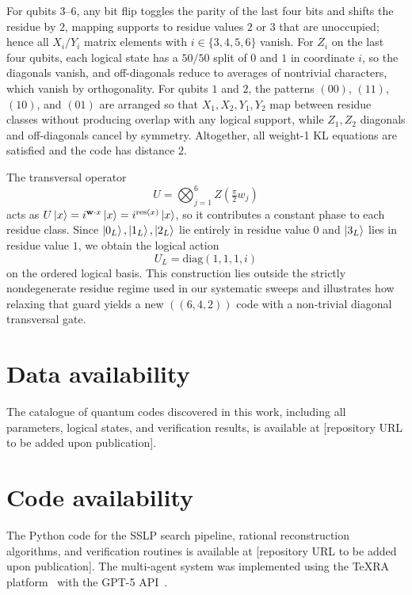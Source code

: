 \documentclass[pdflatex,sn-nature]{sn-jnl}%
\theoremstyle{thmstyleone}%
\theoremstyle{thmstyletwo}%
\theoremstyle{thmstylethree}%
\begin{document}
For qubits $3$–$6$, any bit flip toggles the parity of the last four bits and shifts the residue by $2$, mapping supports to residue values $2$ or $3$ that are unoccupied; hence all $X_i/Y_i$ matrix elements with $i\in\{3,4,5,6\}$ vanish. For $Z_i$ on the last four qubits, each logical state has a $50/50$ split of $0$ and $1$ in coordinate $i$, so the diagonals vanish, and off-diagonals reduce to averages of nontrivial characters, which vanish by orthogonality. For qubits $1$ and $2$, the patterns $(00)$, $(11)$, $(10)$, and $(01)$ are arranged so that $X_1,X_2,Y_1,Y_2$ map between residue classes without producing overlap with any logical support, while $Z_1,Z_2$ diagonals and off-diagonals cancel by symmetry. Altogether, all weight-1 KL equations are satisfied and the code has distance $2$.

The transversal operator
\[
  U=\bigotimes_{j=1}^6 Z\!\left(\tfrac{\pi}{2} w_j\right)
\]
acts as $U\ket{x}=i^{\mathbf w\cdot x}\ket{x}=i^{\operatorname{res}(x)}\ket{x}$, so it contributes a constant phase to each residue class. Since $\ket{0_L},\ket{1_L},\ket{2_L}$ lie entirely in residue value $0$ and $\ket{3_L}$ lies in residue value $1$, we obtain the logical action
\[
  U_L=\mathrm{diag}(1,1,1,i)
\]
on the ordered logical basis. This construction lies outside the strictly nondegenerate residue regime used in our systematic sweeps and illustrates how relaxing that guard yields a new $((6,4,2))$ code with a non-trivial diagonal transversal gate.







\section*{Data availability}
The catalogue of quantum codes discovered in this work, including all parameters, logical states, and verification results, is available at [repository URL to be added upon publication].

\section*{Code availability}
The Python code for the SSLP search pipeline, rational reconstruction algorithms, and verification routines is available at [repository URL to be added upon publication].
The multi-agent system was implemented using the TeXRA platform~\cite{Texra2025TeXRA} with the GPT-5 API~\cite{Openai2025GPT}.
\end{document}
